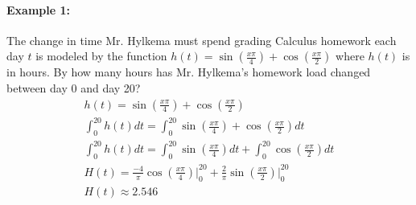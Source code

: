 \documentclass[../revisedmain.tex]{subfiles}
\begin{document}
\paragraph{Example 1:}The change in time Mr. Hylkema must spend grading Calculus homework each day $t$ is modeled by the function $h\left(t\right)=\sin\left(\frac{x\pi}{4}\right)+\cos\left(\frac{x\pi}{2}\right)$ where $h\left(t\right)$ is in hours. By how many hours has Mr. Hylkema's homework load changed between day 0 and day 20?
\begin{gather*}
	h\left(t\right)=\sin\left(\frac{x\pi}{4}\right)+\cos\left(\frac{x\pi}{2}\right)\\
	\int_{0}^{20}h\left(t\right)dt=\int_{0}^{20}\sin\left(\frac{x\pi}{4}\right)+\cos\left(\frac{x\pi}{2}\right)dt\\
	\int_{0}^{20}h\left(t\right)dt=\int_{0}^{20}\sin\left(\frac{x\pi}{4}\right)dt+\int_{0}^{20}\cos\left(\frac{x\pi}{2}\right)dt\\
	H\left(t\right)=\frac{-4}{\pi}\cos\left(\frac{x\pi}{4}\right)\Big|_{0}^{20}+\frac{2}{\pi}\sin\left(\frac{x\pi}{2}\right)\Big|_{0}^{20}\\
	H\left(t\right)\approx2.546\\
	\end{gather*}
\end{document}
